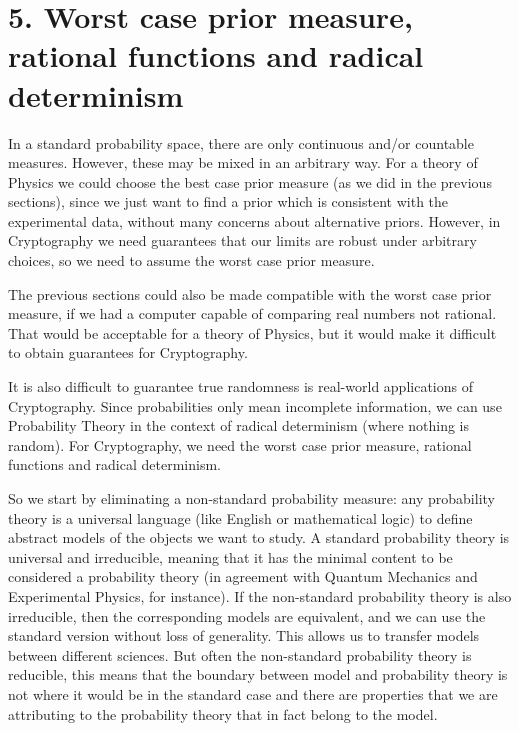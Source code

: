 \documentclass[11pt,a4paper]{report}
\begin{document}
\hypertarget{worst-case-prior-measure-rational-functions-and-radical-determinism}{%
\section{5. Worst case prior measure, rational functions and radical
determinism}\label{worst-case-prior-measure-rational-functions-and-radical-determinism}}

In a standard probability space, there are only continuous and/or
countable measures. However, these may be mixed in an arbitrary way. For
a theory of Physics we could choose the best case prior measure (as we
did in the previous sections), since we just want to find a prior which
is consistent with the experimental data, without many concerns about
alternative priors. However, in Cryptography we need guarantees that our
limits are robust under arbitrary choices, so we need to assume the
worst case prior measure.

The previous sections could also be made compatible with the worst case
prior measure, if we had a computer capable of comparing real numbers
not rational. That would be acceptable for a theory of Physics, but it
would make it difficult to obtain guarantees for Cryptography.

It is also difficult to guarantee true randomness is real-world
applications of Cryptography. Since probabilities only mean incomplete
information, we can use Probability Theory in the context of radical
determinism (where nothing is random). For Cryptography, we need the
worst case prior measure, rational functions and radical determinism.

So we start by eliminating a non-standard probability measure: any
probability theory is a universal language (like English or mathematical
logic) to define abstract models of the objects we want to study. A
standard probability theory is universal and irreducible, meaning that
it has the minimal content to be considered a probability theory (in
agreement with Quantum Mechanics and Experimental Physics, for
instance). If the non-standard probability theory is also irreducible,
then the corresponding models are equivalent, and we can use the
standard version without loss of generality. This allows us to transfer
models between different sciences. But often the non-standard
probability theory is reducible, this means that the boundary between
model and probability theory is not where it would be in the standard
case and there are properties that we are attributing to the probability
theory that in fact belong to the model.
\end{document}
